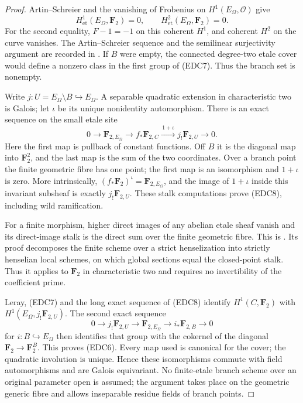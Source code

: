 \begin{proof}
Artin--Schreier and the vanishing of Frobenius on
\(H^1(E_\Omega,\mathcal O)\) give
\[
       H^1_{\mathrm{et}}(E_\Omega,\mathbf F_2)=0,
       \qquad H^2_{\mathrm{et}}(E_\Omega,\mathbf F_2)=0.
                                                        \tag{EDC7}
\]
For the second equality, \(F-1=-1\) on this coherent
\(H^1\), and coherent \(H^2\) on the curve vanishes.
The Artin--Schreier sequence and the semilinear surjectivity
argument are recorded in
\citep[Section~59.63 and Lemma~59.63.2, complete proof]
{StacksArtinSchreierCP37}.
If \(B\) were empty, the connected degree-two etale cover
would define a nonzero class in the first group of (EDC7).
Thus the branch set is nonempty.

Write \(j:U=E_\Omega\setminus B\hookrightarrow E_\Omega\).
A separable quadratic extension in characteristic two is Galois;
let \(\iota\) be its unique nonidentity automorphism. There is
an exact sequence on the small etale site
\[
 0\longrightarrow\mathbf F_{2,E_\Omega}
  \longrightarrow f_*\mathbf F_{2,C}
  \xrightarrow{\,1+\iota\,}j_!\mathbf F_{2,U}
  \longrightarrow0.                                \tag{EDC8}
\]
Here the first map is pullback of constant functions. Off \(B\)
it is the diagonal map into \(\mathbf F_2^2\), and the last
map is the sum of the two coordinates. Over a branch point
the finite geometric fibre has one point; the first map is an
isomorphism and \(1+\iota\) is zero. More intrinsically,
\((f_*\mathbf F_2)^\iota=\mathbf F_{2,E_\Omega}\), and
the image of \(1+\iota\) inside this invariant subsheaf is
exactly \(j_!\mathbf F_{2,U}\). These stalk computations
prove (EDC8), including wild ramification.

For a finite morphism, higher direct images of any abelian
etale sheaf vanish and its direct-image stalk is the direct
sum over the finite geometric fibre. This is
\citep[Proposition~59.55.2, with Lemma~59.55.1; full proofs]
{StacksFiniteEtaleDirectCP37}. Its proof decomposes the finite
scheme over a strict henselization into strictly henselian local
schemes, on which global sections equal the closed-point stalk.
Thus it applies to \(\mathbf F_2\) in characteristic two and
requires no invertibility of the coefficient prime.

Leray, (EDC7) and the long exact sequence of (EDC8) identify
\(H^1(C,\mathbf F_2)\) with
\(H^1(E_\Omega,j_!\mathbf F_{2,U})\). The second exact
sequence
\[
 0\longrightarrow j_!\mathbf F_{2,U}
  \longrightarrow\mathbf F_{2,E_\Omega}
  \longrightarrow i_*\mathbf F_{2,B}\longrightarrow0
                                                        \tag{EDC9}
\]
for \(i:B\hookrightarrow E_\Omega\) then identifies that
group with the cokernel of the diagonal
\(\mathbf F_2\to\mathbf F_2^B\). This proves (EDC6).
Every map used is canonical for the cover; the quadratic
involution is unique. Hence these isomorphisms commute with
field automorphisms and are Galois equivariant. No finite-etale
branch scheme over an original parameter open is assumed;
the argument takes place on the geometric generic fibre and
allows inseparable residue fields of branch points.
\end{proof}

